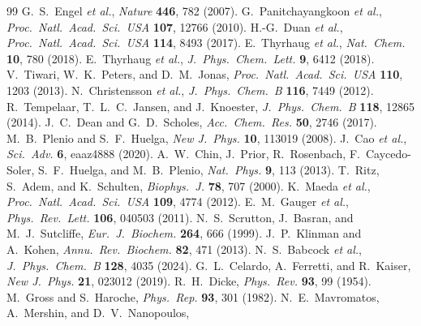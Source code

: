 \documentclass[twocolumn,10pt]{article}
\begin{document}
\begin{thebibliography}{99}
 G.~S.~Engel \textit{et al.}, \textit{Nature}
\textbf{446}, 782 (2007).
 G.~Panitchayangkoon \textit{et al.},
\textit{Proc.\ Natl.\ Acad.\ Sci.\ USA} \textbf{107}, 12766 (2010).
 H.-G.~Duan \textit{et al.},
\textit{Proc.\ Natl.\ Acad.\ Sci.\ USA} \textbf{114}, 8493 (2017).
 E.~Thyrhaug \textit{et al.},
\textit{Nat.\ Chem.} \textbf{10}, 780 (2018).
 E.~Thyrhaug \textit{et al.},
\textit{J.\ Phys.\ Chem.\ Lett.} \textbf{9}, 6412 (2018).
 V.~Tiwari, W.~K.~Peters, and D.~M.~Jonas,
\textit{Proc.\ Natl.\ Acad.\ Sci.\ USA} \textbf{110}, 1203 (2013).
 N.~Christensson \textit{et al.},
\textit{J.\ Phys.\ Chem.\ B} \textbf{116}, 7449 (2012).
 R.~Tempelaar, T.~L.~C.~Jansen, and J.~Knoester,
\textit{J.\ Phys.\ Chem.\ B} \textbf{118}, 12865 (2014).
 J.~C.~Dean and G.~D.~Scholes,
\textit{Acc.\ Chem.\ Res.} \textbf{50}, 2746 (2017).
 M.~B.~Plenio and S.~F.~Huelga,
\textit{New J.\ Phys.} \textbf{10}, 113019 (2008).
 J.~Cao \textit{et al.},
\textit{Sci.\ Adv.} \textbf{6}, eaaz4888 (2020).
 A.~W.~Chin, J.~Prior, R.~Rosenbach, F.~Caycedo-Soler,
S.~F.~Huelga, and M.~B.~Plenio,
\textit{Nat.\ Phys.} \textbf{9}, 113 (2013).
 T.~Ritz, S.~Adem, and K.~Schulten,
\textit{Biophys.\ J.} \textbf{78}, 707 (2000).
 K.~Maeda \textit{et al.},
\textit{Proc.\ Natl.\ Acad.\ Sci.\ USA} \textbf{109}, 4774 (2012).
 E.~M.~Gauger \textit{et al.},
\textit{Phys.\ Rev.\ Lett.} \textbf{106}, 040503 (2011).
 N.~S.~Scrutton, J.~Basran, and M.~J.~Sutcliffe,
\textit{Eur.\ J.\ Biochem.} \textbf{264}, 666 (1999).
 J.~P.~Klinman and A.~Kohen,
\textit{Annu.\ Rev.\ Biochem.} \textbf{82}, 471 (2013).
 N.~S.~Babcock \textit{et al.},
\textit{J.\ Phys.\ Chem.\ B} \textbf{128}, 4035 (2024).
 G.~L.~Celardo, A.~Ferretti, and R.~Kaiser,
\textit{New J.\ Phys.} \textbf{21}, 023012 (2019).
 R.~H.~Dicke,
\textit{Phys.\ Rev.} \textbf{93}, 99 (1954).
 M.~Gross and S.~Haroche,
\textit{Phys.\ Rep.} \textbf{93}, 301 (1982).
 N.~E.~Mavromatos, A.~Mershin, and D.~V.~Nanopoulos,

\end{thebibliography}
\end{document}
